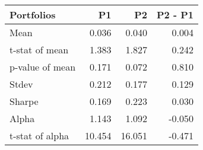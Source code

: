 \begin{tabular}{lrrr}
\toprule
Portfolios & P1 & P2 & P2 - P1 \\
\midrule
Mean & 0.036 & 0.040 & 0.004 \\
t-stat of mean & 1.383 & 1.827 & 0.242 \\
p-value of mean & 0.171 & 0.072 & 0.810 \\
Stdev & 0.212 & 0.177 & 0.129 \\
Sharpe & 0.169 & 0.223 & 0.030 \\
Alpha & 1.143 & 1.092 & -0.050 \\
t-stat of alpha & 10.454 & 16.051 & -0.471 \\
\bottomrule
\end{tabular}
